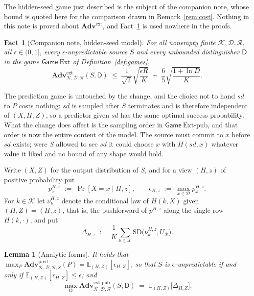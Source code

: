 \documentclass[11pt,a4paper]{article}
\theoremstyle{plain}
\newtheorem{lemma}{Lemma}
\newtheorem{fact}{Fact}
\theoremstyle{definition}
\theoremstyle{remark}
\newcommand{\Adv}{\mathbf{Adv}}
\newcommand{\Gm}{\mathsf{Game}}
\newcommand{\Ext}{\mathrm{Ext}}
\newcommand{\Extp}{\mathrm{Ext}\text{-}\mathrm{pub}}
\newcommand{\pred}{\mathrm{pred}}
\newcommand{\ext}{\mathrm{ext}}
\newcommand{\extp}{\mathrm{ext}\text{-}\mathrm{pub}}
\newcommand{\sd}{\mathit{sd}}
\newcommand{\SD}{\mathrm{SD}}
\newcommand{\calK}{\mathcal{K}}
\newcommand{\calD}{\mathcal{D}}
\newcommand{\calR}{\mathcal{R}}
\begin{document}
The hidden-seed game just described is the subject of the companion note, whose bound is quoted
here for the comparison drawn in Remark~\ref{rem:cost}. Nothing in this note is proved about
$\Adv^{\ext}$, and Fact~\ref{fact:hidden} is used nowhere in the proofs.

\begin{fact}[Companion note, hidden-seed model]\label{fact:hidden}
For all nonempty finite $\calK, \calD, \calR$, all $\epsilon \in (0,1]$, every
$\epsilon$-unpredictable source $S$ and every unbounded distinguisher $\mathsf{D}$ in the game
$\Gm\ \Ext$ of Definition~\ref{def:games},
\[
  \Adv^{\ext}_{\calK,\calD,\calR}(S,\mathsf{D})
  \;\le\; \frac{1}{\sqrt{2}}\sqrt{\frac{\epsilon R}{K}}
       \;+\; \frac{6}{5}\sqrt{\frac{1 + \ln D}{K}} .
\]
\end{fact}

The prediction game is untouched by the change, and the choice not to hand $\sd$ to $P$ costs
nothing: $\sd$ is sampled after $S$ terminates and is therefore independent of $(X,H,Z)$, so a
predictor given $\sd$ has the same optimal success probability. What the change does affect is
the sampling order in $\Gm\ \Extp$, and that order is now the entire content of the model. The
source must commit to $x$ before $\sd$ exists; were $S$ allowed to see $\sd$ it could choose $x$
with $H(\sd,x)$ whatever value it liked and no bound of any shape would hold.

Write $(X,Z)$ for the output distribution of $S$, and for a view $(H,z)$ of positive probability put
\[
  p^{H,z}_{x} \;:=\; \Pr[X = x \mid H, z] ,
  \qquad
  \epsilon_{H,z} \;:=\; \max_{x \in \calD} p^{H,z}_{x} .
\]
For $k \in \calK$ let $\nu^{H,z}_{k}$ denote the conditional law of $H(k, X)$ given $(H,Z) = (H,z)$,
that is, the pushforward of $p^{H,z}$ along the single row $H(k,\cdot)$, and put
\[
  \Delta_{H,z} \;:=\; \frac{1}{K}\sum_{k \in \calK} \SD\bigl(\nu^{H,z}_{k}, U_{\calR}\bigr).
\]

\begin{lemma}[Analytic forms]\label{lem:analytic}
It holds that
$\max_{P} \Adv^{\pred}_{\calK,\calD,\calR,S}(P) = \mathbb{E}_{(H,Z)}[\epsilon_{H,Z}]$, so that
$S$ is $\epsilon$-unpredictable if and only if $\mathbb{E}_{(H,Z)}[\epsilon_{H,Z}] \le \epsilon$;
and
\begin{equation}\label{eq:analytic}
  \max_{\mathsf{D}}\Adv^{\extp}_{\calK,\calD,\calR}(S,\mathsf{D})
  \;=\; \mathbb{E}_{(H,Z)}\bigl[\Delta_{H,Z}\bigr] .
\end{equation}
\end{lemma}
\end{document}
